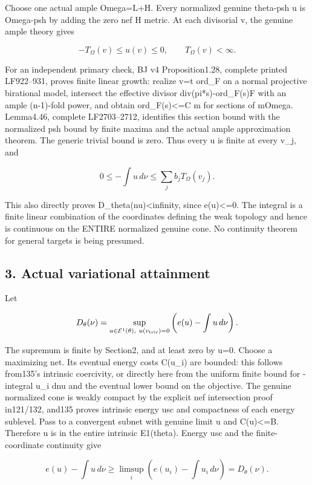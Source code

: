 \documentclass[
  10pt,
]{article}
\begin{document}
Choose one actual ample Omega=L+H. Every normalized genuine theta-psh u
is Omega-psh by adding the zero nef H metric. At each divisorial v, the
genuine ample theory gives

\[-T_\Omega(v)\leq u(v)\leq0,\qquad T_\Omega(v)<\infty.\]

For an independent primary check, BJ v4 Proposition1.28, complete
printed LF922--931, proves finite linear growth: realize v=t ord\_F on a
normal projective birational model, intersect the effective divisor
div(pi*s)-ord\_F(s)F with an ample (n-1)-fold power, and obtain
ord\_F(s)\textless=C m for sections of mOmega. Lemma4.46, complete
LF2703--2712, identifies this section bound with the normalized psh
bound by finite maxima and the actual ample approximation theorem. The
generic trivial bound is zero. Thus every u is finite at every v\_j, and

\[0\leq-\int u\,d\nu\leq\sum_j b_j T_\Omega(v_j).\]

This also directly proves D\_theta(nu)\textless infinity, since
e(u)\textless=0. The integral is a finite linear combination of the
coordinates defining the weak topology and hence is continuous on the
ENTIRE normalized genuine cone. No continuity theorem for general
targets is being presumed.

\subsection{3. Actual variational
attainment}\label{actual-variational-attainment}

Let

\[D_\theta(\nu)=\sup_{u\in\mathcal E^1(\theta),\ u(v_{\rm triv})=0}
\left(e(u)-\int u\,d\nu\right).\]

The supremum is finite by Section2, and at least zero by u=0. Choose a
maximizing net. Its eventual energy costs C(u\_i) are bounded: this
follows from135's intrinsic coercivity, or directly here from the
uniform finite bound for -integral u\_i dnu and the eventual lower bound
on the objective. The genuine normalized cone is weakly compact by the
explicit nef intersection proof in121/132, and135 proves intrinsic
energy usc and compactness of each energy sublevel. Pass to a convergent
subnet with genuine limit u and C(u)\textless=B. Therefore u is in the
entire intrinsic E1(theta). Energy usc and the finite-coordinate
continuity give

\[e(u)-\int u\,d\nu\geq\limsup_i\left(e(u_i)-\int u_i\,d\nu\right)=D_\theta(\nu).\]
\end{document}
